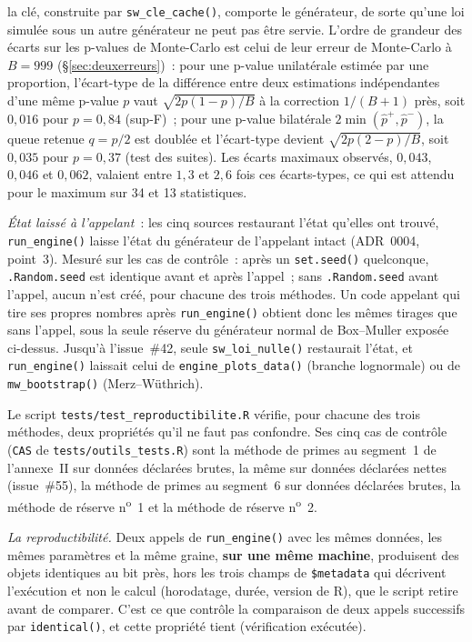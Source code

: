 \documentclass[a4paper,11pt]{article}
\newcommand{\code}[1]{\texttt{\small #1}}
\begin{document}
la clé, construite par \code{sw\_cle\_cache()}, comporte le générateur, de sorte qu'une loi
simulée sous un autre générateur ne peut pas être servie. L'ordre de grandeur des écarts
sur les p-values de Monte-Carlo est celui de leur erreur de Monte-Carlo à $B = 999$
(§\ref{sec:deuxerreurs})~: pour une p-value unilatérale estimée par une
proportion, l'écart-type de la différence entre deux estimations indépendantes
d'une même p-value $p$ vaut $\sqrt{2p(1-p)/B}$ à la correction $1/(B+1)$ près,
soit $0{,}016$ pour $p = 0{,}84$ (sup-F)~; pour une p-value bilatérale
$2\min(\hat p^{+},\hat p^{-})$, la queue retenue $q = p/2$ est doublée et
l'écart-type devient $\sqrt{2p(2-p)/B}$, soit $0{,}035$ pour $p = 0{,}37$ (test
des suites). Les écarts maximaux observés, $0{,}043$, $0{,}046$ et $0{,}062$,
valaient entre $1{,}3$ et $2{,}6$ fois ces écarts-types, ce qui est attendu pour
le maximum sur 34 et 13 statistiques.

\emph{État laissé à l'appelant}~: les cinq sources restaurant l'état qu'elles ont trouvé,
\code{run\_engine()} laisse l'état du générateur de l'appelant intact (ADR~0004, point~3).
Mesuré sur les cas de contrôle~: après un \code{set.seed()} quelconque, \code{.Random.seed} est
identique avant et après l'appel~; sans \code{.Random.seed} avant l'appel, aucun n'est créé,
pour chacune des trois méthodes. Un code appelant qui tire ses propres nombres après
\code{run\_engine()} obtient donc les mêmes tirages que sans l'appel, sous la seule réserve
du générateur normal de Box--Muller exposée ci-dessus. Jusqu'à l'issue~\#42,
seule \code{sw\_loi\_nulle()} restaurait l'état, et \code{run\_engine()} laissait celui de
\code{engine\_plots\_data()} (branche lognormale) ou de \code{mw\_bootstrap()}
(Merz--Wüthrich).

Le script \code{tests/test\_reproductibilite.R} vérifie, pour chacune des trois
méthodes, deux propriétés qu'il ne faut pas confondre. Ses cinq cas de contrôle
(\code{CAS} de \code{tests/outils\_tests.R}) sont la méthode de primes au segment~1 de
l'annexe~II sur données déclarées brutes, la même sur données déclarées nettes (issue~\#55), la
méthode de primes au segment~6 sur données déclarées brutes, la méthode de réserve n\textsuperscript{o}~1 et la méthode de
réserve n\textsuperscript{o}~2.

\emph{La reproductibilité.} Deux appels de \code{run\_engine()} avec les mêmes
données, les mêmes paramètres et la même graine, \textbf{sur une même machine},
produisent des objets identiques au bit près, hors les trois champs de
\code{\$metadata} qui décrivent l'exécution et non le calcul (horodatage, durée,
version de R), que le script retire avant de comparer. C'est ce que contrôle la
comparaison de deux appels successifs par \code{identical()}, et cette propriété
tient (vérification exécutée).
\end{document}
